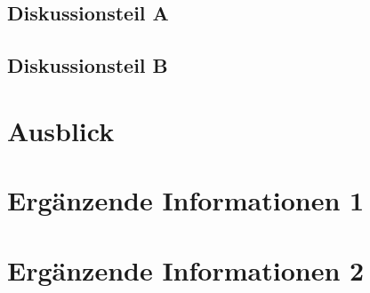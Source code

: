 \documentclass[fontsize=11pt,%
twoside,%
BCOR          = 8mm, %
DIV           = 11,  %
titlepage     = off,%
index=totoc,%
xcolor        = pdftex,%
dvipsnames,%
bibliography  = totoc,%
listof        = notnumbered]{scrreprt}
\begin{document}
\section{Diskussionsteil A}\label{sec:diskussionA}
\Blindtext

\section{Diskussionsteil B}\label{sec:diskussionB}
\Blindtext
\cleardoublepage

\chapter{Ausblick}\label{chap:ausblick}
\Blindtext
\cleardoublepage

\printbibliography
\cleardoublepage

\appendix

\chapter{Ergänzende Informationen 1}
\blindtext
\cleardoublepage

\chapter{Ergänzende Informationen 2}
\blindtext
\end{document}
